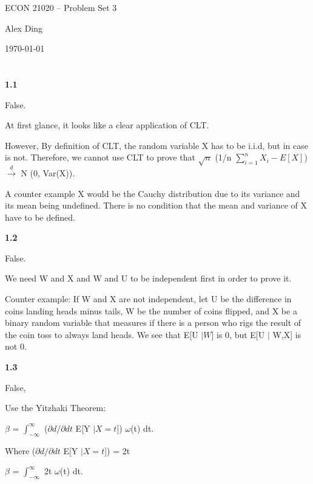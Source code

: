 



{\LARGE \centering ECON 21020 -- Problem Set 3\par}
{\vspace{-1em} \large \centering Alex Ding \par}
{\centering \vspace{-1em} \today \par }


\section{}

\textbf{1.1}

False.

At first glance, it looks like a clear application of CLT.

However,
By definition of CLT, the random variable X has to be i.i.d, but in case is not. Therefore, we cannot use CLT to prove that $\sqrt{n}$ (1/n $\sum^n_{i=1} X_{i} - E[X]$) $\xrightarrow{d}$ N (0, Var(X)).

A counter example X would be the Cauchy distribution due to its variance and its mean being undefined. There is no condition that the mean and variance of X have to be defined.

\textbf{1.2}

False.

We need W and X and W and U to be independent first in order to prove it.

Counter example:
If W and X are not independent, 
let U be the difference in coins landing heads minus tails, W be the number of coins flipped, and X be a binary random variable that measures if there is a person who rigs the result of the coin toss to always land heads. We see that E[U $\mid W$] is 0, but E[U $\mid$ W,X] is not 0. 

\textbf{1.3}

False,

Use the Yitzhaki Theorem:

$\beta$ = $\int_{-\infty}^{\infty}$ ($\partial{d}/\partial{dt}$ E[Y $\mid X = t$]) $\omega$(t) dt.

Where ($\partial{d}/\partial{dt}$ E[Y $\mid X = t$]) = 2t

$\beta$ = $\int_{-\infty}^{\infty}$ 2t $\omega$(t) dt.

